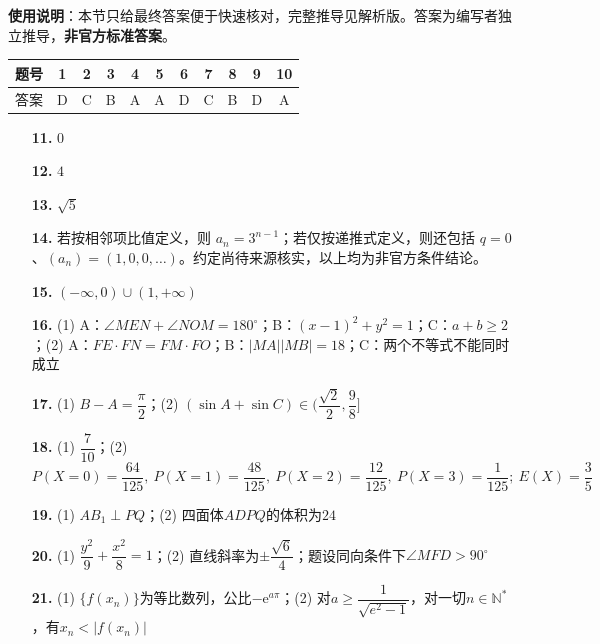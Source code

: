 
\begin{gknotice}
\textbf{使用说明}：本节只给最终答案便于快速核对，完整推导见解析版。答案为编写者独立推导，\textbf{非官方标准答案}。
\end{gknotice}

\begin{center}\begin{tabular}{ccccccccccc}
\toprule
题号 & 1 & 2 & 3 & 4 & 5 & 6 & 7 & 8 & 9 & 10 \\
\midrule
答案 & D & C & B & A & A & D & C & B & D & A \\
\bottomrule
\end{tabular}\end{center}

\begin{itemize}[leftmargin=2.6em]
  \item[\textbf{11.}] \(0\)
  \item[\textbf{12.}] \(4\)
  \item[\textbf{13.}] \(\sqrt5\)
  \item[\textbf{14.}] 若按相邻项比值定义，则 \(a_n=3^{n-1}\)；若仅按递推式定义，则还包括 \(q=0\)、\((a_n)=(1,0,0,\ldots)\)。约定尚待来源核实，以上均为非官方条件结论。
  \item[\textbf{15.}] \((-\infty,0)\cup(1,+\infty)\)
\end{itemize}

\begin{itemize}[leftmargin=2.6em]
  \item[\textbf{16.}] (1) A：\(\angle MEN+\angle NOM=180^\circ\)；B：\((x-1)^2+y^2=1\)；C：\(a+b\geqslant2\)；(2) A：\(FE\cdot FN=FM\cdot FO\)；B：\(|MA||MB|=18\)；C：两个不等式不能同时成立
  \item[\textbf{17.}] (1) \(B-A=\dfrac{\pi}{2}\)；(2) \((\sin A+\sin C)\in(\dfrac{\sqrt2}{2},\dfrac98]\)
  \item[\textbf{18.}] (1) \(\dfrac7{10}\)；(2) \(P(X=0)=\dfrac{64}{125},\ P(X=1)=\dfrac{48}{125},\ P(X=2)=\dfrac{12}{125},\ P(X=3)=\dfrac1{125};\ E(X)=\dfrac35\)
  \item[\textbf{19.}] (1) \(AB_1\perp PQ\)；(2) 四面体\(ADPQ\)的体积为\(24\)
  \item[\textbf{20.}] (1) \(\dfrac{y^2}{9}+\dfrac{x^2}{8}=1\)；(2) 直线斜率为\(\pm\dfrac{\sqrt6}{4}\)；题设同向条件下\(\angle MFD>90^\circ\)
  \item[\textbf{21.}] (1) \(\{f(x_n)\}\)为等比数列，公比\(-\mathrm e^{a\pi}\)；(2) 对\(a\geqslant\dfrac1{\sqrt{e^2-1}}\)，对一切\(n\in\mathbb N^*\)，有\(x_n<|f(x_n)|\)
\end{itemize}
